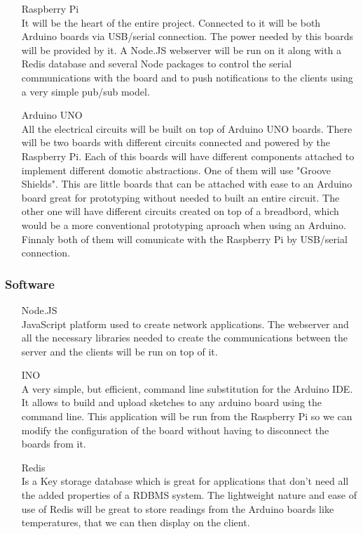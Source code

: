 \documentclass[a4paper]{article}
\begin{document}
\begin{itemize}

\item[Raspberry Pi] \hfill \\ 
It will be the heart of the entire project. Connected to it will be both Arduino boards via USB/serial connection. The power needed by this boards will be provided by it. A Node.JS webserver will be run on it along with a Redis database and several Node packages to control the serial communications with the board and to push notifications to the clients using a very simple pub/sub model.

\item[Arduino UNO] \hfill \\ 
All the electrical circuits will be built on top of Arduino UNO boards. There will be two boards with different circuits connected and powered by the Raspberry Pi. Each of this boards will have different components attached to implement different domotic abstractions. One of them will use "Groove Shields". This are little boards that can be attached with ease to an Arduino board great for prototyping without needed to built an entire circuit. The other one will have different circuits created on top of a breadbord, which would be a more conventional prototyping aproach when using an Arduino. Finnaly both of them will comunicate with the Raspberry Pi by USB/serial connection.

\end{itemize}

\subsubsection{Software}

\begin{itemize}

\item[Node.JS] \hfill \\ 
JavaScript platform used to create network applications. The webserver and all the necessary libraries needed to create the communications between the server and the clients will be run on top of it.

\item[INO] \hfill \\ 
A very simple, but efficient, command line substitution for the Arduino IDE. It allows to build and upload sketches to any arduino board using the command line. This application will be run from the Raspberry Pi so we can modify the configuration of the board without having to disconnect the boards from it.

\item[Redis] \hfill \\
Is a Key storage database which is great for applications that don't need all the added properties of a RDBMS system. The lightweight nature and ease of use of Redis will be great to store readings from the Arduino boards like temperatures, that we can then display on the client.

\end{itemize}
\end{document}
